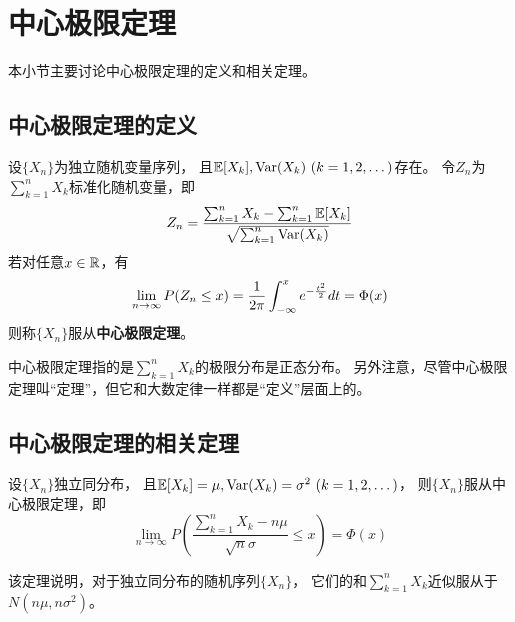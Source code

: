 \section{中心极限定理}
本小节主要讨论中心极限定理的定义和相关定理。

\subsection{中心极限定理的定义}
\begin{definition}[中心极限定理]
  设$\{X_n\}$为独立随机变量序列，
  且$\mexpect[X_k],\mvar(X_k)\ (k=1,2,\dots)$存在。
  令$Z_n$为$\sum_{k=1}^nX_k$标准化随机变量，即
  \begin{displaymath}
    Z_n = \frac{\sum_{k=1}^{n}X_k - \sum_{k=1}^{n}\mathbb{E}[X_k]}
      {\sqrt{\sum_{k=1}^{n}\textrm{Var}(X_k)}}
  \end{displaymath}
  若对任意$x\in\mathbb{R}$，有
  \begin{displaymath}
    \lim_{n\to\infty} P(Z_n\le x) =
      \frac{1}{2\pi}\int_{-\infty}^{x} e^{-\frac{t^2}{2}}dt = \Phi(x)
  \end{displaymath}
  则称$\{X_n\}$服从\textbf{中心极限定理}。
\end{definition}

\begin{remark}
  中心极限定理指的是$\sum_{k=1}^n X_k$的极限分布是正态分布。
  另外注意，尽管中心极限定理叫``定理''，但它和大数定律一样都是``定义''层面上的。
\end{remark}

\subsection{中心极限定理的相关定理}

\begin{theorem}
  设$\{X_n\}$独立同分布，
  且$\mexpect[X_k]=\mu,\mvar(X_k)=\sigma^2\ (k=1,2,\dots)$，
  则$\{X_n\}$服从中心极限定理，即
  \begin{displaymath}
    \lim_{n\to\infty}P\left(\frac{\sum_{k=1}^{n}X_k-n\mu}{\sqrt{n}\sigma}
      \le x\right) = \Phi(x)
  \end{displaymath}
\end{theorem}

\begin{remark}
  该定理说明，对于独立同分布的随机序列$\{X_n\}$，
  它们的和$\sum_{k=1}^n X_k$近似服从于$N(n\mu, n\sigma^2)$。
\end{remark}

